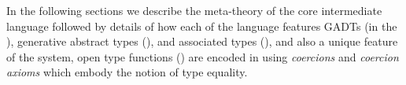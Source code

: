 \documentclass[screen,nonacm,manuscript,review]{acmart} %
\begin{document}
In the following sections we describe the meta-theory of the core intermediate
language followed by details of how each of the language features
GADTs (in the ), generative abstract
types (), and associated
types (), and also a unique feature of
the system, open type functions () are
encoded in \SFC using \emph{coercions} and \emph{coercion
  axioms} which embody the notion of type equality.








\end{document}
